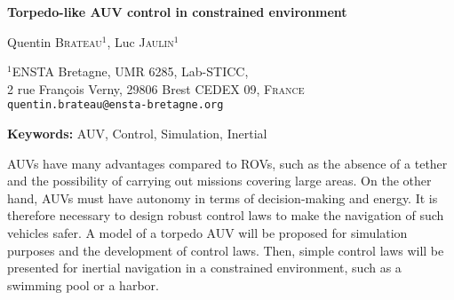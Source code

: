 \documentclass[14pt, a4paper]{article}
\begin{document}
	\begin{center}

		{\Large\bf Torpedo-like AUV control in constrained environment}

		\vspace*{0.8cm}

		{\large Quentin \textsc{Brateau}$^{1}$, Luc \textsc{Jaulin}$^{1}$}

		\bigskip

		{\small $^{1}$ENSTA Bretagne, UMR 6285, Lab-STICC, \\
		2 rue François Verny, 29806 Brest CEDEX 09, \textsc{France} \\
		\texttt{quentin.brateau@ensta-bretagne.org}
		}

	\end{center}

	\bigskip

	{\noindent\bf Keywords:} AUV, Control, Simulation, Inertial

	AUVs have many advantages compared to ROVs, such as the absence of a tether and the possibility of carrying out missions covering large areas. On the other hand, AUVs must have autonomy in terms of decision-making and energy. It is therefore necessary to design robust control laws to make the navigation of such vehicles safer. A model of a torpedo AUV will be proposed for simulation purposes and the development of control laws. Then, simple control laws will be presented for inertial navigation in a constrained environment, such as a swimming pool or a harbor.

	\medskip
\end{document}
